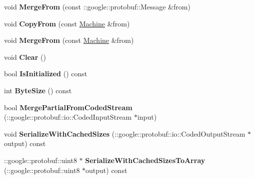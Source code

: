 \begin{DoxyCompactItemize}
\item 
void {\bfseries Merge\+From} (const \+::google\+::protobuf\+::\+Message \&from)\hypertarget{classmachines_1_1Machine_aab1a9f0422cb52ca5781abfe38dc6aa8}{}\label{classmachines_1_1Machine_aab1a9f0422cb52ca5781abfe38dc6aa8}

\item 
void {\bfseries Copy\+From} (const \hyperlink{classmachines_1_1Machine}{Machine} \&from)\hypertarget{classmachines_1_1Machine_a1ef5ec4d9c03347fafcbe852c8713810}{}\label{classmachines_1_1Machine_a1ef5ec4d9c03347fafcbe852c8713810}

\item 
void {\bfseries Merge\+From} (const \hyperlink{classmachines_1_1Machine}{Machine} \&from)\hypertarget{classmachines_1_1Machine_a110d8b5bd9c882d5ce284408ce2360fc}{}\label{classmachines_1_1Machine_a110d8b5bd9c882d5ce284408ce2360fc}

\item 
void {\bfseries Clear} ()\hypertarget{classmachines_1_1Machine_a83f013a6037eb1a0f4bb8f6480fcf203}{}\label{classmachines_1_1Machine_a83f013a6037eb1a0f4bb8f6480fcf203}

\item 
bool {\bfseries Is\+Initialized} () const \hypertarget{classmachines_1_1Machine_ac58156f3089f29f3db2652fd9e0bb5a9}{}\label{classmachines_1_1Machine_ac58156f3089f29f3db2652fd9e0bb5a9}

\item 
int {\bfseries Byte\+Size} () const \hypertarget{classmachines_1_1Machine_afadfed0c3b2e6bf73fd6b67e563cf12b}{}\label{classmachines_1_1Machine_afadfed0c3b2e6bf73fd6b67e563cf12b}

\item 
bool {\bfseries Merge\+Partial\+From\+Coded\+Stream} (\+::google\+::protobuf\+::io\+::\+Coded\+Input\+Stream $\ast$input)\hypertarget{classmachines_1_1Machine_a905f5a8e9551450e7ed999709c0822ad}{}\label{classmachines_1_1Machine_a905f5a8e9551450e7ed999709c0822ad}

\item 
void {\bfseries Serialize\+With\+Cached\+Sizes} (\+::google\+::protobuf\+::io\+::\+Coded\+Output\+Stream $\ast$output) const \hypertarget{classmachines_1_1Machine_a184c7d162b62e3a1c786a85e120447a7}{}\label{classmachines_1_1Machine_a184c7d162b62e3a1c786a85e120447a7}

\item 
\+::google\+::protobuf\+::uint8 $\ast$ {\bfseries Serialize\+With\+Cached\+Sizes\+To\+Array} (\+::google\+::protobuf\+::uint8 $\ast$output) const \hypertarget{classmachines_1_1Machine_a34a75799ebb229a2d1661e2607cd1b3f}{}\label{classmachines_1_1Machine_a34a75799ebb229a2d1661e2607cd1b3f}


\end{DoxyCompactItemize}
